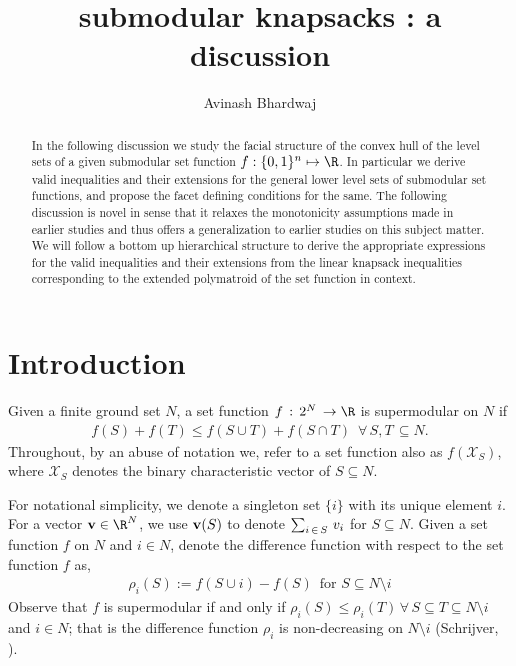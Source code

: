 \documentclass[10pt,twoside]{amsart}
\title[Submodular Knapsacks : A Discussion]{%
submodular knapsacks : a discussion \\[1.75em]}
\author{Avinash Bhardwaj}
\begin{document}
\onehalfspacing

%
%

\date{}
\maketitle

\begin{abstract}
    \vspace{2.25em} In the following discussion we study the facial structure of the convex hull of the level sets of a given submodular set function $f: \binset^n\mapsto \R$. In particular we derive valid inequalities and their extensions for the general lower level sets of submodular set functions, and propose the facet defining conditions for the same. The following discussion is novel in sense that it relaxes the monotonicity assumptions made in earlier studies and thus offers a generalization to earlier studies on this subject matter. We will follow a bottom up hierarchical structure to derive the appropriate expressions for the valid inequalities and their extensions from the linear knapsack inequalities corresponding to the extended polymatroid of the set function in context.
\end{abstract}

\singlespacing
\section{Introduction}
Given a finite ground set $N$, a set function $f\,:\,2^N\,\rightarrow {\R}$ is supermodular on $N$ if
\begin{align*}
    f(S) + f(T) \leq f(S\cup T) + f(S\cap T)\,\,\,\forall\,S,T\,\subseteq N.
\end{align*}
Throughout, by an abuse of notation we, refer to a set function also as $f(\mathcal{X}_S)$, where $\mathcal{X}_S$ denotes the binary characteristic vector of $S\subseteq N$.

For notational simplicity, we denote a singleton set $\{i\}$ with its unique element $i$. For a vector $\v \in {\R}^N$, we use $\mathbf{v}(S)$ to denote $\sum_{i\,\in\, S}\,v_i$ for $S\subseteq N$. Given a set function $f$ on $N$ and $i \in N$, denote the difference function with respect to the set function $f$ as,
\begin{align*}
    \rho_i(S) := f(S\cup i) - f(S) \,\,\,\text{for $S \subseteq N\setminus i$}
\end{align*}
Observe that $f$ is supermodular if and only if $\rho_i(S) \leq \rho_i(T)\,\forall\,S\subseteq T\subseteq N\setminus i$ and $i \in N$; that is the difference function $\rho_i$ is non-decreasing on $N\setminus i$ (Schrijver, \cite{Schrijver2003}).
\end{document}
